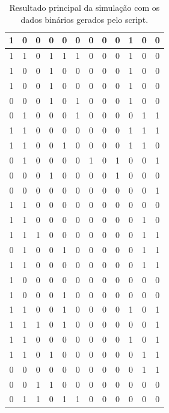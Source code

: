 \begin{table}[H]
\caption{Resultado principal da simulação com os dados binários gerados pelo script.}
\label{q.res2}
\centering
\begin{tabular}{|c|c|c|c|c|c|c|c|c|c|c|c|}
\hline
1 & 0 & 0 & 0 & 0 & 0 & 0 & 0 & 0 & 1 & 0 & 0 \\ \hline
1 & 1 & 0 & 1 & 1 & 1 & 0 & 0 & 0 & 1 & 0 & 0 \\ \hline
1 & 0 & 0 & 1 & 0 & 0 & 0 & 0 & 0 & 1 & 0 & 0 \\ \hline
1 & 0 & 0 & 1 & 0 & 0 & 0 & 0 & 0 & 1 & 0 & 0 \\ \hline
0 & 0 & 0 & 1 & 0 & 1 & 0 & 0 & 0 & 1 & 0 & 0 \\ \hline
0 & 1 & 0 & 0 & 0 & 1 & 0 & 0 & 0 & 0 & 1 & 1 \\ \hline
1 & 1 & 0 & 0 & 0 & 0 & 0 & 0 & 0 & 1 & 1 & 1 \\ \hline
1 & 1 & 0 & 0 & 1 & 0 & 0 & 0 & 0 & 1 & 1 & 0 \\ \hline
0 & 1 & 0 & 0 & 0 & 0 & 1 & 0 & 1 & 0 & 0 & 1 \\ \hline
0 & 0 & 0 & 1 & 0 & 0 & 0 & 0 & 1 & 0 & 0 & 0 \\ \hline
0 & 0 & 0 & 0 & 0 & 0 & 0 & 0 & 0 & 0 & 0 & 1 \\ \hline
1 & 1 & 0 & 0 & 0 & 0 & 0 & 0 & 0 & 0 & 0 & 0 \\ \hline
1 & 1 & 0 & 0 & 0 & 0 & 0 & 0 & 0 & 0 & 1 & 0 \\ \hline
1 & 1 & 1 & 0 & 0 & 0 & 0 & 0 & 0 & 0 & 1 & 1 \\ \hline
0 & 1 & 0 & 0 & 1 & 0 & 0 & 0 & 0 & 0 & 1 & 1 \\ \hline
1 & 1 & 0 & 0 & 0 & 0 & 0 & 0 & 0 & 0 & 1 & 1 \\ \hline
1 & 0 & 0 & 0 & 0 & 0 & 0 & 0 & 0 & 0 & 0 & 0 \\ \hline
1 & 0 & 0 & 0 & 1 & 0 & 0 & 0 & 0 & 0 & 0 & 0 \\ \hline
1 & 1 & 0 & 0 & 1 & 0 & 0 & 0 & 0 & 1 & 0 & 1 \\ \hline
1 & 1 & 1 & 0 & 1 & 0 & 0 & 0 & 0 & 0 & 0 & 1 \\ \hline
1 & 1 & 0 & 0 & 0 & 0 & 0 & 0 & 0 & 1 & 0 & 1 \\ \hline
1 & 1 & 0 & 1 & 0 & 0 & 0 & 0 & 0 & 0 & 1 & 1 \\ \hline
0 & 0 & 0 & 0 & 0 & 0 & 0 & 0 & 0 & 0 & 1 & 1 \\ \hline
0 & 0 & 1 & 1 & 0 & 0 & 0 & 0 & 0 & 0 & 0 & 0 \\ \hline
0 & 1 & 1 & 0 & 1 & 1 & 0 & 0 & 0 & 0 & 0 & 0 \\ \hline

\end{tabular}
\end{table}
